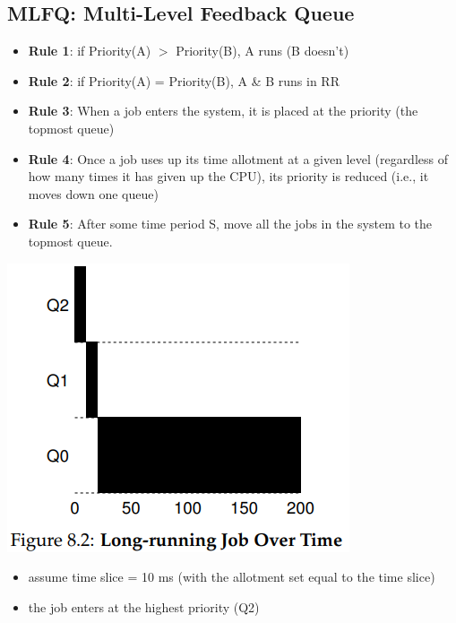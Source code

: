\documentclass[8pt,a4paper,landscape]{extarticle}
\begin{document}
\begin{multicols*}{3}
\section*{MLFQ: Multi-Level Feedback Queue}
\begin{itemize}
\item \textbf{Rule 1}: if Priority(A) $>$ Priority(B), A runs (B doesn't)
\item \textbf{Rule 2}: if Priority(A) = Priority(B), A \& B runs in RR
\item \textbf{Rule 3}: When a job enters the system, it is placed at the  priority (the topmost queue)
\item \textbf{Rule 4}: Once a job uses up its time allotment at a given level (regardless of how many times it has given up the CPU), its priority is reduced (i.e., it moves down one queue)
\item \textbf{Rule 5}: After some time period S, move all the jobs in the system to the topmost queue.
\end{itemize}
\begin{minipage}{.4\linewidth}
\includegraphics[width=\linewidth]{imgs/sched_longr}
\end{minipage}
\begin{minipage}{.6\linewidth}
  \flushleft
  \begin{itemize}
  \item assume time slice = 10 ms (with the allotment set equal to the time slice)
  \item the job enters at the highest priority (Q2)

\end{itemize}
\end{minipage}
\end{multicols*}
\end{document}
